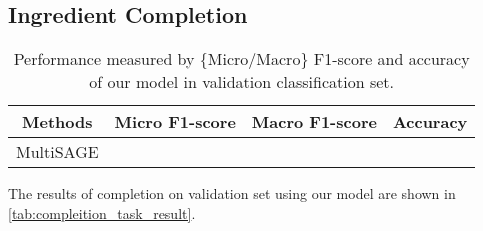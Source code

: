  \subsection{Ingredient Completion}
   
 \begin{table}[btp!]
    \centering
    \begin{tabular}{ c c c c }
        \toprule
        \textbf{Methods} & \textbf{Micro F1-score} & \textbf{Macro F1-score} & \textbf{Accuracy} \\
        \midrule
        MultiSAGE & & & \\
        \bottomrule
    \end{tabular}
    \caption{\label{tab:compleition_task_result}Performance measured by \{Micro/Macro\} F1-score and accuracy of our model in validation classification set.}

 \end{table}
The results of completion on validation set using our model are shown in \autoref{tab:compleition_task_result}. 
 
\begin{comment}
\begin{enumerate}
    \item MultiSAGE
    \begin{enumerate}
        \item Node Embedding
        \newline fig1 : heteogeneous node enbedding
        \item evaluate node Embedding
    \end{enumerate}
    \item Classification task
    \begin{enumerate}
        \item Evaluate models
        \newline fig2 models performance
    \end{enumerate}
    \item Completion task
    \begin{enumerate}
        \item Evaluate models
        \newline fig3 model performance
    \end{enumerate}
\end{enumerate}
\end{comment}


